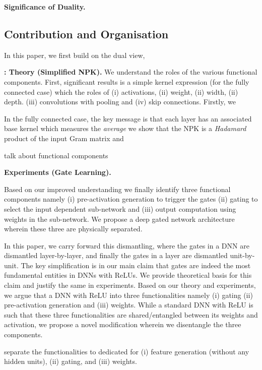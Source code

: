 \documentclass{article} %
\begin{document}
\textbf{Significance of Duality.} 

\subsection{Contribution and Organisation}
 
In this paper, we first build on the dual view,

\textbf{ : Theory (Simplified NPK).}  We understand the roles of the various functional components. First, significant results is  a simple kernel expression (for the fully connected case) which the roles of (i) activations, (ii) weight, (ii) width, (ii) depth. 
 (iii) convolutions with pooling and (iv) skip connections. Firstly, we 

In the fully connected case, the key message is that each layer has an associated base kernel which measures the \emph{average} 
we show that the NPK is a \emph{Hadamard} product of the input Gram matrix and $$

talk about functional components


\textbf{Experiments (Gate Learning).} 

Based on our improved understanding we finally identify three functional components namely (i) pre-activation generation to trigger the gates (ii) gating to select the input dependent sub-network and (iii) output computation using weights in the sub-network. We propose a deep gated network architecture wherein these three are physically separated. 




In this paper, we carry forward this dismantling, where the gates in a DNN are dismantled layer-by-layer, and finally the gates in a layer are dismantled unit-by-unit. The key simplification is in our main claim that gates are indeed the most fundamental entities in DNNs with ReLUs. We provide theoretical basis for this claim and justify the same in experiments. Based on our theory and experiments, we argue that a DNN with ReLU into three functionalities namely (i) gating (ii) pre-activation generation and (iii) weights. While a standard DNN with ReLU is such that these three functionalities are shared/entangled between its weights and activation,  we propose a novel modification wherein we disentangle the three components. 

 separate the functionalities to dedicated for (i) feature generation (without any hidden units), (ii) gating, and (iii) weights. 
\end{document}

